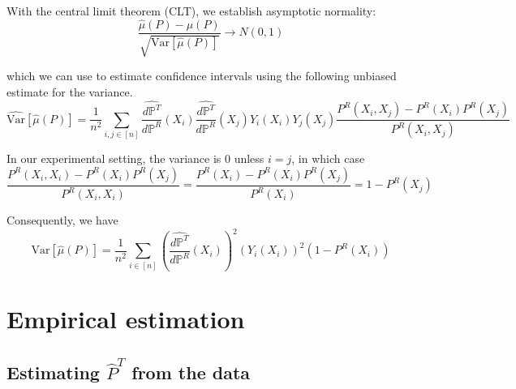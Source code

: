 \documentclass{article}
\newcommand{\vl}[1]{\textcolor{orange}{[VL: #1]}}
\begin{document}
With the central limit theorem (CLT), we establish asymptotic normality:
\begin{equation*}
    \frac{\hat{\mu}(P) - \mu(P)}{\sqrt{\text{Var}[\hat{\mu}(P)]}}\rightarrow N(0,1)
\end{equation*}

which we can use to estimate confidence intervals using the following unbiased estimate for the variance.
\begin{equation*}
    \widehat{\text{Var}}[\hat{\mu}(P)] = \frac{1}{n^2} \sum_{i,j \in [n]} \frac{\hat{d \mathbb{P}^T}}{d \mathbb{P}^R}(X_i)\frac{\hat{d \mathbb{P}^T}}{d \mathbb{P}^R}(X_j)Y_i(X_i)Y_j(X_j)\frac{P^R(X_i,X_j) - P^R(X_i)P^R(X_j)}{P^R(X_i,X_j)}
\end{equation*}

In our experimental setting, the variance is 0 unless $i=j$, in which case
$$\frac{P^R(X_i,X_i)-P^R(X_i)P^R(X_j)}{P^R(X_i,X_i)} = \frac{P^R(X_i)-P^R(X_i)P^R(X_j)}{P^R(X_i)} = 1-P^R(X_j)$$

Consequently, we have
\begin{equation*}
    \widehat{\text{Var}}[\hat{\mu}(P)] = \frac{1}{n^2} \sum_{i \in [n]} \left(\frac{\hat{d \mathbb{P}^T}}{d \mathbb{P}^R}(X_i)\right)^2 (Y_i(X_i))^2 (1-P^R(X_i))
\end{equation*}



\section{Empirical estimation}

\subsection{Estimating $\hat{P}^T$ from the data}
\end{document}
